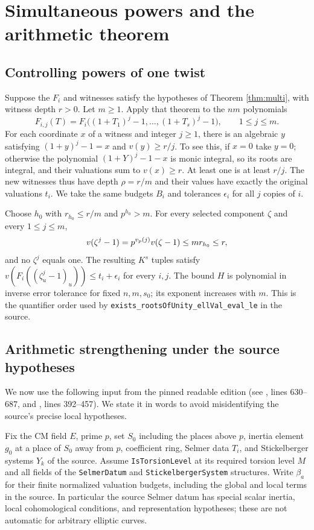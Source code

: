 \documentclass[11pt]{article}
\theoremstyle{remark}\newtheorem{remark}[theorem]{Remark}
\begin{document}
\section{Simultaneous powers and the arithmetic theorem}
\subsection{Controlling powers of one twist}
Suppose the $F_i$ and witnesses satisfy the hypotheses of Theorem
\ref{thm:multi}, with witness depth $r>0$. Let $m\ge1$. Apply that
theorem to the $nm$ polynomials
\[
 F_{i,j}(T)=F_i\big((1+T_1)^j-1,\ldots,(1+T_s)^j-1\big),
 \qquad 1\le j\le m.
\]
For each coordinate $x$ of a witness and integer $j\ge1$, there is an
algebraic $y$ satisfying $(1+y)^j-1=x$ and $v(y)\ge r/j$. To see this,
if $x=0$ take $y=0$; otherwise the polynomial
$(1+Y)^j-1-x$ is monic integral, so its roots are integral, and their
valuations sum to $v(x)\ge r$. At least one is at least $r/j$.
The new witnesses thus have depth $\rho=r/m$ and their values have
exactly the original valuations $t_i$. We take the same budgets
$B_i$ and tolerances $\epsilon_i$ for all $j$ copies of $i$.

Choose $h_0$ with $r_{h_0}\le r/m$ and $p^{h_0}>m$.
For every selected component $\zeta$ and every $1\le j\le m$,
\[
 v(\zeta^j-1)=p^{v_p(j)}v(\zeta-1)\le m r_{h_0}\le r,
\]
and no $\zeta^j$ equals one. The resulting $K^s$ tuples satisfy
$v(F_i((\zeta_u^j-1)_u))\le t_i+\epsilon_i$ for every $i,j$.
The bound $H$ is polynomial in inverse error tolerance for fixed $n,m,s_0$;
its exponent increases with $m$. This is the quantifier order used by
\texttt{exists\_rootsOfUnity\_ellVal\_eval\_le} in the source.

\subsection{Arithmetic strengthening under the source hypotheses}
We now use the following input from the pinned readable edition (see
, lines 630--687, and ,
lines 392--457). We state it in words to avoid misidentifying the
source's precise local hypotheses.

Fix the CM field $E$, prime $p$, set $S_0$ including the places above
$p$, inertia element $g_0$ at a place of $S_0$ away from $p$, coefficient
ring, Selmer data $T_i$, and Stickelberger systems $Y_k$ of the source.
Assume \texttt{IsTorsionLevel} at its required torsion level $M$ and all
fields of the \texttt{SelmerDatum} and \texttt{StickelbergerSystem}
structures. Write $\beta_a$ for their finite normalized valuation
budgets, including the global and local terms in the source. In
particular the source Selmer datum has special scalar inertia,
local cohomological conditions, and representation hypotheses; these
are not automatic for arbitrary elliptic curves.
\end{document}
